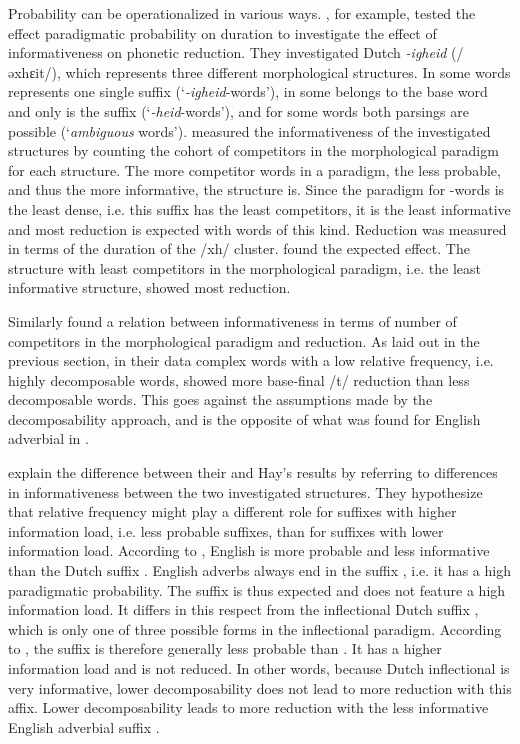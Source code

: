 { 
 Probability can be operationalized in various ways. 
   \cite{Pluymaekers.2010}, for example, tested the effect paradigmatic probability on duration to investigate the effect of informativeness on phonetic reduction.
 They investigated Dutch \textit{-igheid} (/əxhɛit/), which represents three different morphological structures. In some words  represents one single suffix (`\textit{-igheid}-words'), in some  belongs to the base word and only  is the suffix (`\textit{-heid}-words'), and for some words both parsings are possible (`\textit{ambiguous} words'). \cite{Pluymaekers.2010} measured the informativeness of the investigated structures by counting the cohort of competitors in the morphological paradigm for each structure. 
 The more competitor words in a paradigm, the less probable, and thus the more informative, the structure is.  Since the paradigm for -words is the least dense, i.e. this suffix has the least competitors, it is the least informative and most reduction is expected with words of this kind. Reduction was measured in terms of the duration of the /xh/ cluster. \cite{Pluymaekers.2010} found the expected effect. The structure with least competitors in the morphological paradigm, i.e. the least informative structure, showed most reduction.
  
  
 Similarly \cite{Schuppler.2012} found a relation between informativeness in terms of number of competitors in the morphological paradigm and reduction. 
 As laid out in the previous section, in their data complex words with a low relative frequency, i.e. highly decomposable words, showed more base-final /t/ reduction than less decomposable words. This goes against the assumptions made by the decomposability approach, and is the opposite of what was found for English adverbial  in \cite{Hay.2003}. 
 
 \cite{Schuppler.2012} explain the difference between their and Hay's results by referring to differences in informativeness between the two investigated structures. 
 They hypothesize that relative frequency might play a different role for suffixes with higher information load, i.e. less probable suffixes, than for suffixes with lower information load. According to \cite{Schuppler.2012}, English  is more probable and less informative than the Dutch suffix . 
 English adverbs always end in the suffix , i.e. it has a high paradigmatic probability. The suffix is thus expected and does not feature a high information load. It differs in this respect from the inflectional Dutch suffix , which is only one of three possible forms in the inflectional paradigm. According to \cite{Schuppler.2012}, the suffix  is therefore generally less probable than . It has a higher information load and is not reduced. In other words, because Dutch inflectional  is very informative, lower decomposability does not lead to more reduction with this affix. Lower decomposability leads to more reduction with the less informative English adverbial suffix  .
 
}
